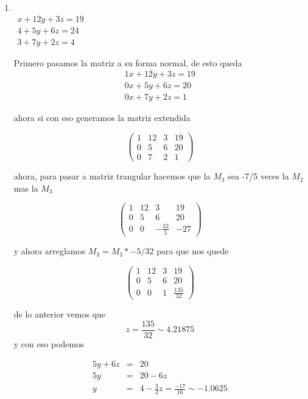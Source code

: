 \documentclass[11pt]{article}
\begin{document}
\begin{multicols}{2}
\begin{enumerate}[\bf{Sistema} 1]
		\item
			\ \\ $\begin{matrix}
				x + 12y + 3z = 19 \\
				4 +  5y + 6z = 24 \\
				3 +  7y + 2z = 4
			\end{matrix}$
			
			\par Primero pasamos la matriz a su forma normal, de esto queda
			$$\begin{matrix}
				1x + 12y + 3z = 19 \\
				0x +  5y + 6z = 20 \\
				0x +  7y + 2z = 1
			\end{matrix}$$
			
			ahora si con eso generamos la matriz extendida
			
			$$\left(\begin{array}{rrrr}
				1 & 12 & 3 & 19 \\
				0 & 5 & 6 & 20 \\
				0 & 7 & 2 & 1
			\end{array}\right)$$
			
 			ahora, para pasar a matriz trangular hacemos que la $M_3$ sea -7/5 veces la $M_2$ mas la $M_3$
			
			$$\left(\begin{array}{rrrr}
				1 & 12 & 3 & 19 \\
				0 & 5 & 6 & 20 \\
				0 & 0 & -\frac{32}{5} & -27
			\end{array}\right)$$
			
			y ahora arreglamos $M_3 = M_3 * -5/32$ para que nos quede
			
			$$\left(\begin{array}{rrrr}
				1 & 12 & 3 & 19 \\
				0 & 5 & 6 & 20 \\
				0 & 0 & 1 & \frac{135}{32}
			\end{array}\right)$$
			
			de lo anterior vemos que $$z = \frac{135}{32} \sim 4.21875$$ y con eso podemos
			
			\begin{eqnarray*}
				5y + 6z &=& 20 \\
				5y &=& 20 - 6z \\
				y &=& 4 - \frac{3}{2}z = \frac{-17}{16} \sim -1.0625
			\end{eqnarray*}
			

\end{enumerate}
\end{multicols}
\end{document}
